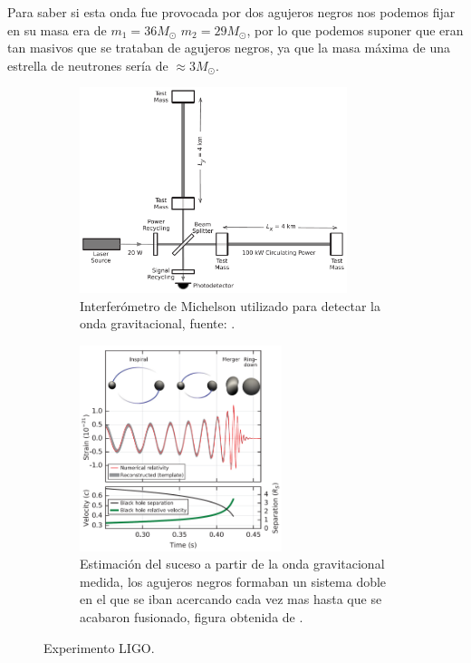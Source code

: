 \documentclass{article}
\begin{document}
Para saber si esta onda fue provocada por dos agujeros negros nos podemos fijar en su masa era de $m_{1}=36M_{\odot}$ $m_{2}=29M_{\odot}$,\cite{abbott2017observation} por lo que podemos suponer que eran tan masivos que se trataban de agujeros negros, ya que la masa máxima de una estrella de neutrones sería de $\approx 3M_{\odot}$.\cite{kalogera1996maximum}

\begin{figure}[H]
\begin{subfigure}{0.5\textwidth}
\includegraphics[width=0.9\linewidth, height=6cm]{Michelson_LIGO.png} 
\caption{Interferómetro de Michelson utilizado para detectar la onda gravitacional, fuente: \cite{abbott2017observation}.}
\label{fig:Michelson}
\end{subfigure}\hspace{1cm}
\begin{subfigure}{0.5\textwidth}
\includegraphics[width=0.9\linewidth, height=6cm]{LIGO.png}
\caption{Estimación del suceso a partir de la onda gravitacional medida, los agujeros negros formaban un sistema doble en el que se iban acercando cada vez mas hasta que se acabaron fusionado, figura obtenida de \cite{abbott2017observation}.}
\label{fig:Experimento LIGO.}
\end{subfigure}
\caption{Experimento LIGO.}
\label{fig:image2}
\end{figure}
\end{document}
